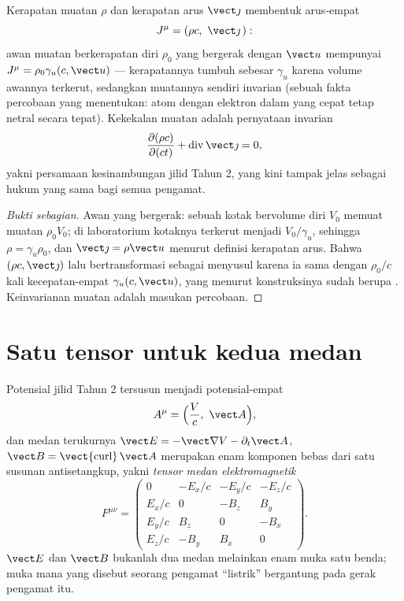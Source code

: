 \begin{proposition}\label{prop:b3:covariant-electromagnetism:fourcurrent}
Kerapatan muatan $\rho$ dan kerapatan arus $\vect\jmath$ membentuk
arus-empat
\[
J^\mu = (\rho c,\ \vect\jmath\,) :
\]
awan muatan berkerapatan diri $\rho_0$ yang bergerak dengan $\vect u$
mempunyai $J^\mu = \rho_0\gamma_u(c, \vect u)$ --- kerapatannya tumbuh
sebesar $\gamma_u$ karena volume awannya terkerut, sedangkan muatannya
sendiri invarian (sebuah fakta percobaan yang menentukan: atom dengan
elektron dalam yang cepat tetap netral secara tepat). Kekekalan muatan
adalah pernyataan invarian
\[
\frac{\partial(\rho c)}{\partial(ct)} +
\operatorname{div}\vect\jmath = 0 ,
\]
yakni persamaan kesinambungan jilid Tahun 2, yang kini tampak jelas
sebagai hukum yang sama bagi semua pengamat.
\end{proposition}

\begin{proof}[Bukti sebagian]
Awan yang bergerak: sebuah kotak bervolume diri $V_0$ memuat muatan $\rho_0
V_0$; di laboratorium kotaknya terkerut menjadi $V_0/\gamma_u$,
sehingga $\rho =
\gamma_u\rho_0$, dan $\vect\jmath = \rho\vect u$
menurut definisi kerapatan arus. Bahwa $(\rho c, \vect\jmath)$ lalu
bertransformasi sebagai  menyusul karena ia sama dengan
$\rho_0/c$ kali kecepatan-empat $\gamma_u(c, \vect u)$, yang menurut
konstruksinya sudah berupa . Keinvarianan muatan adalah
masukan percobaan.
\end{proof}

\section{Satu tensor untuk kedua medan}

\begin{definition}\label{def:b3:covariant-electromagnetism:tensor}
Potensial jilid Tahun 2 tersusun menjadi potensial-empat
\[
A^\mu = \Big(\frac{V}{c},\ \vect A\Big) ,
\]
dan medan terukurnya $\vect E = -\vect\nabla V -
\partial_t\vect A$, $\vect B = \operatorname{\vect{curl}}\vect A$
merupakan enam komponen bebas dari satu susunan antisetangkup, yakni
\emph{tensor medan elektromagnetik}
\[
F^{\mu\nu} =
\begin{pmatrix}
0 & -E_x/c & -E_y/c & -E_z/c\\
E_x/c & 0 & -B_z & B_y\\
E_y/c & B_z & 0 & -B_x\\
E_z/c & -B_y & B_x & 0
\end{pmatrix} .
\]
$\vect E$ dan $\vect B$ bukanlah dua medan melainkan enam muka satu
benda; muka mana yang disebut seorang pengamat ``listrik'' bergantung
pada gerak pengamat itu.
\end{definition}

